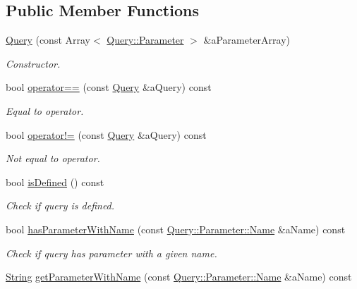 \subsection*{Public Member Functions}
\begin{DoxyCompactItemize}
\item 
\hyperlink{classostk_1_1io_1_1url_1_1_query_a10299b6b445c39886d6b689c14364fe1}{Query} (const Array$<$ \hyperlink{classostk_1_1io_1_1url_1_1_query_1_1_parameter}{Query\+::\+Parameter} $>$ \&a\+Parameter\+Array)
\begin{DoxyCompactList}\small\item\em Constructor. \end{DoxyCompactList}\item 
bool \hyperlink{classostk_1_1io_1_1url_1_1_query_a2e971d5f134f3229f136b62a5218a9cd}{operator==} (const \hyperlink{classostk_1_1io_1_1url_1_1_query}{Query} \&a\+Query) const
\begin{DoxyCompactList}\small\item\em Equal to operator. \end{DoxyCompactList}\item 
bool \hyperlink{classostk_1_1io_1_1url_1_1_query_a13c472bd1b80a7ebccec0eeaae327154}{operator!=} (const \hyperlink{classostk_1_1io_1_1url_1_1_query}{Query} \&a\+Query) const
\begin{DoxyCompactList}\small\item\em Not equal to operator. \end{DoxyCompactList}\item 
bool \hyperlink{classostk_1_1io_1_1url_1_1_query_aae898ea9a490fe19a500cf33e2fc9921}{is\+Defined} () const
\begin{DoxyCompactList}\small\item\em Check if query is defined. \end{DoxyCompactList}\item 
bool \hyperlink{classostk_1_1io_1_1url_1_1_query_a58d1738acbe0d1c2fa329245f7a75eb5}{has\+Parameter\+With\+Name} (const \hyperlink{classostk_1_1io_1_1url_1_1_query_1_1_parameter_ad176899a3555e0d0efeb0c13f73a8a80}{Query\+::\+Parameter\+::\+Name} \&a\+Name) const
\begin{DoxyCompactList}\small\item\em Check if query has parameter with a given name. \end{DoxyCompactList}\item 
\hyperlink{namespaceostk_1_1io_a95d49b120613a7610cb1b4f03b1116b6}{String} \hyperlink{classostk_1_1io_1_1url_1_1_query_ac55b9803b0807160ea5aa42912b412b4}{get\+Parameter\+With\+Name} (const \hyperlink{classostk_1_1io_1_1url_1_1_query_1_1_parameter_ad176899a3555e0d0efeb0c13f73a8a80}{Query\+::\+Parameter\+::\+Name} \&a\+Name) const

\end{DoxyCompactItemize}
